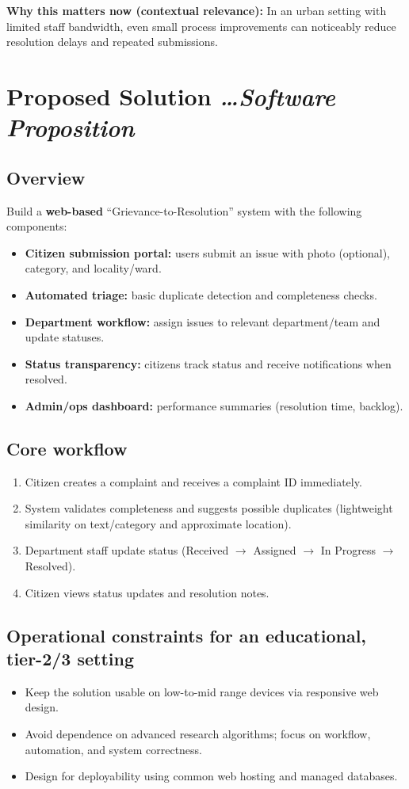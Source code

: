 \documentclass[11pt,a4paper]{article}
\newcommand{\BvrHint}[1]{%
  {\normalfont\normalsize\itshape\hfill #1}}
\begin{document}
\textbf{Why this matters now (contextual relevance):} In an urban setting with limited staff bandwidth, even small process improvements can noticeably reduce resolution delays and repeated submissions.

\section{Proposed Solution %
\BvrHint{\ldots Software Proposition}}
\subsection{Overview}
Build a \textbf{web-based} ``Grievance-to-Resolution'' system with the following components:
\begin{itemize}[leftmargin=0.7cm]
    \item \textbf{Citizen submission portal:} users submit an issue with photo (optional), category, and locality/ward.
    \item \textbf{Automated triage:} basic duplicate detection and completeness checks.
    \item \textbf{Department workflow:} assign issues to relevant department/team and update statuses.
    \item \textbf{Status transparency:} citizens track status and receive notifications when resolved.
    \item \textbf{Admin/ops dashboard:} performance summaries (resolution time, backlog).
\end{itemize}

\subsection{Core workflow}
\begin{enumerate}[leftmargin=0.7cm]
    \item Citizen creates a complaint and receives a complaint ID immediately.
    \item System validates completeness and suggests possible duplicates (lightweight similarity on text/category and approximate location).
    \item Department staff update status (Received $\rightarrow$ Assigned $\rightarrow$ In Progress $\rightarrow$ Resolved).
    \item Citizen views status updates and resolution notes.
\end{enumerate}

\subsection{Operational constraints for an educational, tier-2/3 setting}
\begin{itemize}[leftmargin=0.7cm]
    \item Keep the solution usable on low-to-mid range devices via responsive web design.
    \item Avoid dependence on advanced research algorithms; focus on workflow, automation, and system correctness.
    \item Design for deployability using common web hosting and managed databases.
\end{itemize}
\end{document}
